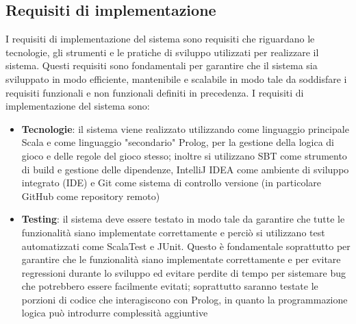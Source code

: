\subsection{Requisiti di implementazione} \label{subsec:implementation_requirements}
I requisiti di implementazione del sistema sono requisiti che riguardano le tecnologie, gli strumenti e le pratiche di sviluppo
utilizzati per realizzare il sistema. Questi requisiti sono fondamentali per garantire che il sistema sia sviluppato in modo
efficiente, mantenibile e scalabile in modo tale da soddisfare i requisiti funzionali e non funzionali definiti in precedenza.
I requisiti di implementazione del sistema sono:
\begin{itemize}
    \item \textbf{Tecnologie}: il sistema viene realizzato utilizzando come linguaggio principale Scala e come 
    linguaggio "secondario" Prolog, per la gestione della logica di gioco e delle regole del gioco stesso; inoltre si utilizzano
    SBT come strumento di build e gestione delle dipendenze, IntelliJ IDEA come ambiente di sviluppo integrato (IDE) e Git come
    sistema di controllo versione (in particolare GitHub come repository remoto)
    \item \textbf{Testing}: il sistema deve essere testato in modo tale da garantire che tutte le funzionalità siano implementate
    correttamente e perciò si utilizzano test automatizzati come ScalaTest e JUnit. Questo è fondamentale soprattutto per garantire
    che le funzionalità siano implementate correttamente e per evitare regressioni durante lo sviluppo ed evitare perdite di tempo
    per sistemare bug che potrebbero essere facilmente evitati; soprattutto saranno testate le porzioni di codice che interagiscono
    con Prolog, in quanto la programmazione logica può introdurre complessità aggiuntive
\end{itemize}